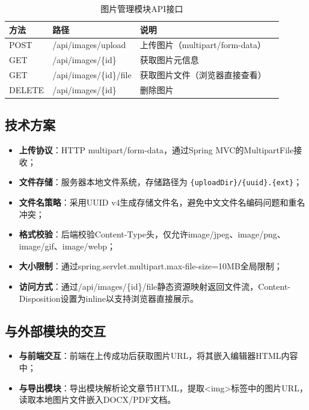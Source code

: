 \begin{table}[htbp]
\centering
\caption{图片管理模块API接口}
\label{tab:img_api}
\begin{tabular}{lllp{5cm}}
\toprule
\textbf{方法} & \textbf{路径} & \textbf{说明} \\
\midrule
POST   & /api/images/upload       & 上传图片（multipart/form-data） \\
GET    & /api/images/\{id\}        & 获取图片元信息 \\
GET    & /api/images/\{id\}/file   & 获取图片文件（浏览器直接查看） \\
DELETE & /api/images/\{id\}        & 删除图片 \\
\bottomrule
\end{tabular}
\end{table}

\subsection{技术方案}

\begin{itemize}
    \item \textbf{上传协议}：HTTP multipart/form-data，通过Spring MVC的MultipartFile接收；
    \item \textbf{文件存储}：服务器本地文件系统，存储路径为 \verb|{uploadDir}/{uuid}.{ext}|；
    \item \textbf{文件名策略}：采用UUID v4生成存储文件名，避免中文文件名编码问题和重名冲突；
    \item \textbf{格式校验}：后端校验Content-Type头，仅允许image/jpeg、image/png、image/gif、image/webp；
    \item \textbf{大小限制}：通过spring.servlet.multipart.max-file-size=10MB全局限制；
    \item \textbf{访问方式}：通过/api/images/\{id\}/file静态资源映射返回文件流，Content-Disposition设置为inline以支持浏览器直接展示。
\end{itemize}

\subsection{与外部模块的交互}

\begin{itemize}
    \item \textbf{与前端交互}：前端在上传成功后获取图片URL，将其嵌入编辑器HTML内容中；
    \item \textbf{与导出模块}：导出模块解析论文章节HTML，提取<img>标签中的图片URL，读取本地图片文件嵌入DOCX/PDF文档。
\end{itemize}

